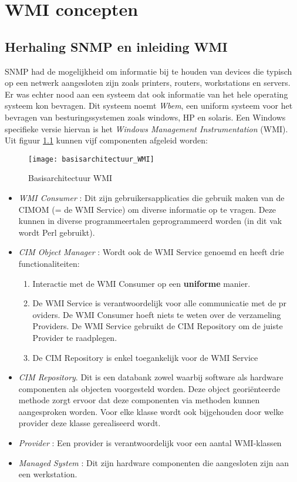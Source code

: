 \documentclass{report}
\begin{document}

	\tableofcontents

	\chapter{WMI concepten}
	\section{Herhaling SNMP en inleiding WMI}
	SNMP had de mogelijkheid om informatie bij te houden van devices die typisch op een netwerk aangesloten zijn zoals printers, routers, workstations en servers. Er was echter nood aan een systeem dat ook informatie van het hele operating systeem kon bevragen.
	Dit systeem noemt \textit{Wbem}, een uniform systeem voor het bevragen van besturingssystemen zoals windows, HP en solaris. Een Windows specifieke versie hiervan is het \textit{Windows Management Instrumentation} (WMI). Uit figuur \ref{fig:basisarchitectuur_WMI} kunnen vijf componenten afgeleid worden:
	\begin{figure}[h]
		\centering
		\texttt{[image: basisarchitectuur\_WMI]}
		\caption{Basisarchitectuur WMI}
		\label{fig:basisarchitectuur_WMI}
	\end{figure}


	\begin{itemize}
		\item \textit{WMI Consumer} : Dit zijn gebruikersapplicaties die gebruik maken van de CIMOM (= de WMI Service) om diverse informatie op te vragen. Deze kunnen in diverse programmeertalen geprogrammeerd worden (in dit vak wordt Perl gebruikt).
		\item \textit{CIM Object Manager} : Wordt ook de WMI Service genoemd en heeft drie functionaliteiten: 
		\begin{enumerate}
			\item Interactie met de WMI Consumer op een \textbf{uniforme} manier.
			\item De WMI Service is verantwoordelijk voor alle communicatie met de pr oviders. De WMI Consumer hoeft niets te weten over de verzameling Providers. De WMI Service gebruikt de CIM Repository om de juiste Provider te raadplegen.
			\item De CIM Repository is enkel toegankelijk voor de WMI Service
		\end{enumerate}
		\item \textit{CIM Repository}. Dit is een databank zowel waarbij software als hardware componenten als objecten voorgesteld worden.  Deze object georiënteerde methode zorgt ervoor dat deze componenten via methoden kunnen aangesproken worden. Voor elke klasse wordt ook bijgehouden door welke provider deze klasse gerealiseerd wordt.
		\item \textit{Provider} : Een provider is verantwoordelijk voor een aantal WMI-klassen
		\item \textit{Managed System} : Dit zijn hardware componenten die aangesloten zijn aan een werkstation.
	\end{itemize}
\end{document}

